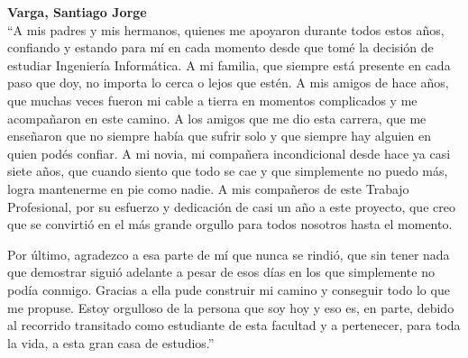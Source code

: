 \noindent\textbf{Varga, Santiago Jorge}\\
``A mis padres y mis hermanos, quienes me apoyaron durante todos estos años, confiando y estando para mí en cada momento desde que tomé la decisión de estudiar Ingeniería Informática. A mi familia, que siempre está presente en cada paso que doy, no importa lo cerca o lejos que estén. A mis amigos de hace años, que muchas veces fueron mi cable a tierra en momentos complicados y me acompañaron en este camino. A los amigos que me dio esta carrera, que me enseñaron que no siempre había que sufrir solo y que siempre hay alguien en quien podés confiar. A mi novia, mi compañera incondicional desde hace ya casi siete años, que cuando siento que todo se cae y que simplemente no puedo más, logra mantenerme en pie como nadie. A mis compañeros de este Trabajo Profesional, por su esfuerzo y dedicación de casi un año a este proyecto, que creo que se convirtió en el más grande orgullo para todos nosotros hasta el momento.

\noindent Por último, agradezco a esa parte de mí que nunca se rindió, que sin tener nada que demostrar siguió adelante a pesar de esos días en los que simplemente no podía conmigo. Gracias a ella pude construir mi camino y conseguir todo lo que me propuse. Estoy orgulloso de la persona que soy hoy y eso es, en parte, debido al recorrido transitado como estudiante de esta facultad y a pertenecer, para toda la vida, a esta gran casa de estudios.''

\newpage
